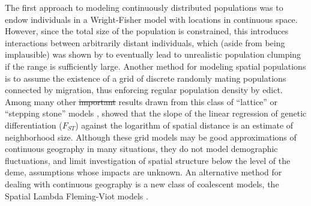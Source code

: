 \documentclass[10pt,twoside,lineno,hidelinks]{preprint} %
\providecommand{\DIFadd}[1]{{\protect\color{blue}\uwave{#1}}} %
\providecommand{\DIFdel}[1]{{\protect\color{red}\sout{#1}}}                      %
\providecommand{\DIFaddbegin}{} %
\providecommand{\DIFaddend}{} %
\providecommand{\DIFdelbegin}{} %
\providecommand{\DIFdelend}{} %
\begin{document}
The first approach to modeling continuously distributed populations
was to endow individuals in a Wright-Fisher model with locations in continuous space.
However, since the total size of the population is constrained, this introduces interactions between arbitrarily distant individuals,
which (aside from being implausible) 
was shown by \citet{Felsenstein1975} to eventually lead to unrealistic population clumping
if the range is sufficiently large.
Another method for modeling spatial populations is to assume the existence of a grid of discrete randomly mating populations connected by migration, 
thus enforcing regular population density by edict.
Among many other \DIFdelbegin \DIFdel{important }\DIFdelend results drawn from this class of ``lattice'' or ``stepping stone'' models
\DIFaddbegin \DIFadd{\mbox{%
\citep{epperson2003geographical}}\hspace{0pt}%
}\DIFaddend , 
\citet{Rousset1997} showed that the slope of the linear regression of genetic differentiation ($F_{ST}$) against the logarithm of spatial distance is an estimate of neighborhood size. 
Although these grid models may be good approximations of continuous geography in many situations,
they do not model demographic fluctuations,
and limit investigation of spatial structure below the level of the deme,
assumptions whose impacts are unknown. 
An alternative method for dealing with continuous geography is a new class of coalescent models,
the Spatial Lambda Fleming-Viot models \citep{Barton2010,Kelleher2014}.
\end{document}
